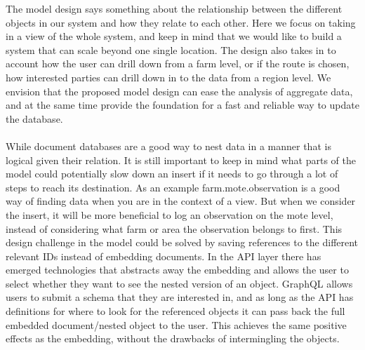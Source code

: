 \documentclass[]{uiophd}
\begin{document}
The model design says something about the relationship between the different objects in our system and how they relate to each other. Here we focus on taking in a view of the whole system, and keep in mind that we would like to build a system that can scale beyond one single location. The design also takes in to account how the user can drill down from a farm level, or if the route is chosen, how interested parties can drill down in to the data from a region level. We envision that the proposed model design can ease the analysis of aggregate data, and at the same time provide the foundation for a fast and reliable way to update the database.
\\\\
While document databases are a good way to nest data in a manner that is logical given their relation. It is still important to keep in  mind what parts of the model could potentially slow down an insert if it needs to go through a lot of steps to reach its destination. As an example farm.mote.observation is a good way of finding data when you are in the context of a view. But when we consider the insert, it will be more beneficial to log an observation on the mote level, instead of considering what farm or area the observation belongs to first. This design challenge in the model could be solved by saving references to the different relevant IDs instead of embedding documents. In the API layer there has emerged technologies that abstracts away the embedding and allows the user to select whether they want to see the nested version of an object. GraphQL allows users to submit a schema that they are interested in, and as long as the API has definitions for where to look for the referenced objects it can pass back the full embedded document/nested object to the user. This achieves the same positive effects as the embedding, without the drawbacks of intermingling the objects.
\end{document}
